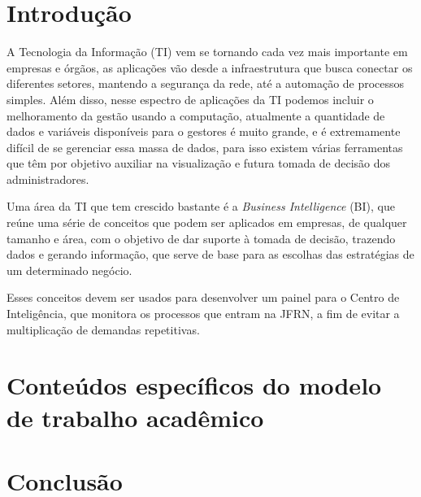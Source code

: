 \chapter*{Introdução}

A Tecnologia da Informação (TI) vem se tornando cada vez mais importante em empresas e órgãos, as aplicações vão desde a infraestrutura que busca conectar os diferentes setores, mantendo a segurança da rede, até a automação de processos simples. Além disso, nesse espectro de aplicações da TI podemos incluir o melhoramento da gestão usando a computação, atualmente a quantidade de dados e variáveis disponíveis para o gestores é muito grande, e é extremamente difícil de se gerenciar essa massa de dados, para isso existem várias ferramentas que têm por objetivo auxiliar na visualização e futura tomada de decisão dos administradores.

Uma área da TI que tem crescido bastante é a \textit{Business Intelligence} (BI), que reúne uma série de conceitos que podem ser aplicados em empresas, de qualquer tamanho e área, com o objetivo de dar suporte à tomada de decisão, trazendo dados e gerando informação, que serve de base para as escolhas das estratégias de um determinado negócio.  

Esses conceitos devem ser usados para desenvolver um painel para o Centro de Inteligência, que monitora os processos que entram na JFRN, a fim de evitar a multiplicação de demandas repetitivas.



%




\chapter{Conteúdos específicos do modelo de trabalho acadêmico}\label{cap_trabalho_academico}


\chapter{Conclusão}
\lipsum[31-33]
